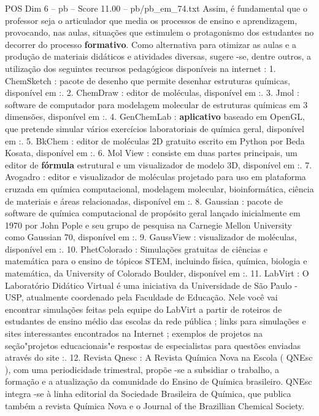 \begin{textsample}{POS Dim 6 – pb – Score 11.00 – pb/pb\_em\_74.txt}
Assim, é fundamental que o professor seja o articulador que media os processos de ensino e aprendizagem, provocando, nas aulas, situações que estimulem o protagonismo dos estudantes no decorrer do processo \textbf{formativo}.
Como alternativa para otimizar as aulas e a produção de materiais didáticos e atividades diversas, sugere -se, dentre outros, a utilização dos seguintes recursos pedagógicos disponíveis na internet : 1.
ChemSketch : pacote de desenho que permite desenhar estruturas químicas, disponível em :. 2.
ChemDraw : editor de moléculas, disponível em :. 3.
Jmol : software de computador para modelagem molecular de estruturas químicas em 3 dimensões, disponível em :. 4.
GenChemLab : \textbf{aplicativo} baseado em OpenGL, que pretende simular vários exercícios laboratoriais de química geral, disponível em :. 5.
BkChem : editor de moléculas 2D gratuito escrito em Python por Beda Kosata, disponível em :. 6.
Mol View : consiste em duas partes principais, um editor de \textbf{fórmula} estrutural e um visualizador de modelo 3D, disponível em :. 7.
Avogadro : editor e visualizador de moléculas projetado para uso em plataforma cruzada em química computacional, modelagem molecular, bioinformática, ciência de materiais e áreas relacionadas, disponível em :. 8.
Gaussian : pacote de software de química computacional de propósito geral lançado inicialmente em 1970 por John Pople e seu grupo de pesquisa na Carnegie Mellon University como Gaussian 70, disponível em :. 9.
GaussView : visualizador de moléculas, disponível em :. 10.
PhetColorado : Simulações gratuitas de ciências e matemática para o ensino de tópicos STEM, incluindo física, química, biologia e matemática, da University of Colorado Boulder, disponível em :. 11.
LabVirt : O Laboratório Didático Virtual é uma iniciativa da Universidade de São Paulo - USP, atualmente coordenado pela Faculdade de Educação.
Nele você vai encontrar simulações feitas pela equipe do LabVirt a partir de roteiros de estudantes de ensino médio das escolas da rede pública ; links para simulações e sites interessantes encontrados na Internet ; exemplos de projetos na seção"projetos educacionais"e respostas de especialistas para questões enviadas através do site :. 12.
Revista Qnesc : A Revista Química Nova na Escola ( QNEsc ), com uma periodicidade trimestral, propõe -se a subsidiar o trabalho, a formação e a atualização da comunidade do Ensino de Química brasileiro.
QNEsc integra -se à linha editorial da Sociedade Brasileira de Química, que publica também a revista Química Nova e o Journal of the Brazillian Chemical Society.

\end{textsample}
